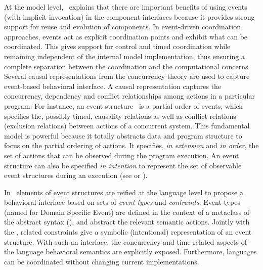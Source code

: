At the model level,~\cite{garlansoftarchbib} explains that there are important benefits of using events (with implicit invocation) in the component interfaces because it provides strong support for reuse and evolution of components. In event-driven coordination approaches, events act as explicit coordination points and exhibit what can be coordinated. This gives support for control and timed coordination while remaining independent of the internal model implementation, thus ensuring a complete separation between the coordination and the computational concerns. Several causal representations from the concurrency theory are used to capture event-based behavioral interface. A causal representation captures the concurrency, dependency and conflict relationships among actions in a particular program. For instance, an event structure~\cite{eventStructures} is a partial order of events, which specifies the, possibly timed, causality relations as well as conflict relations (\ie exclusion relations) between actions of a concurrent system. This fundamental model is powerful because it totally abstracts data and program structure to focus on the partial ordering of actions. It specifies, \emph{in extension} and \emph{in order}, the set of actions that can be observed during the program execution. An event structure can also be specified \emph{in intention} to represent the set of observable event structures during an execution (see \eg\cite{ccslbib} or \cite{tagmachinebib}).

In~\cite{sle13-combemale} elements of event structures are reified at the language level to propose a behavioral interface based on sets of \emph{event types} and \emph{contraints}. Event types (named \dse for Domain Specific Event) are defined in the context of a metaclass of the abstract syntax (\as), and abstract the relevant semantic actions. Jointly with the \dse, related constraints give a symbolic (intentional) representation of an event structure. With such an interface, the concurrency and time-related aspects of the language behavioral semantics are explicitly exposed. Furthermore, languages can be coordinated without changing current implementations. 


